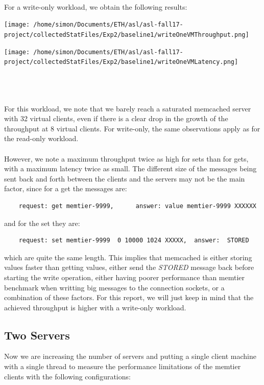 \documentclass[11pt,a4paper]{article}
\begin{document}
\\
For a write-only workload, we obtain the following results:
\\
\begin{minipage}{0.5\linewidth}
\texttt{[image: /home/simon/Documents/ETH/asl/asl-fall17-project/collectedStatFiles/Exp2/baseline1/writeOneVMThroughput.png]}
\end{minipage}
\hfill
\begin{minipage}{0.5\linewidth}
\texttt{[image: /home/simon/Documents/ETH/asl/asl-fall17-project/collectedStatFiles/Exp2/baseline1/writeOneVMLatency.png]}
\end{minipage}
\\\\\\
For this workload, we note that we barely reach a saturated memcached server with 32 virtual clients, even if there is a clear drop in the growth of the throughput at 8 virtual clients. For write-only, the same observations apply as for the read-only workload. 
\\\\
However, we note a maximum throughput twice as high for sets than for gets, with a maximum latency twice as small. The different size of the messages being sent back and forth between the clients and the servers may not be the main factor, since for a get the messages are: 
\begin{lstlisting}
	request: get memtier-9999, 		answer: value memtier-9999 XXXXXX
\end{lstlisting}
and for the set they are:
\begin{lstlisting}
	request: set memtier-9999  0 10000 1024 XXXXX,	answer:  STORED
\end{lstlisting}
which are quite the same length. This implies that memcached is either storing values faster than getting values, either send the \textit{STORED} message back before starting the write operation, either having poorer performance than memtier benchmark when writting big messages to the connection sockets, or a combination of these factors. For this report, we will just keep in mind that the achieved throughput is higher with a write-only workload.
   
\subsection{Two Servers}

Now we are increasing the number of servers and putting a single client machine with a single thread to measure the performance limitations of the memtier clients with the following configurations:
\end{document}
